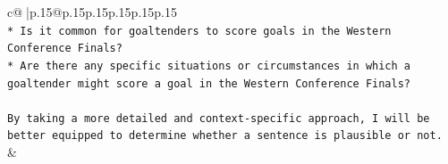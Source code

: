 \documentclass{article}
\begin{document}
{\begin{supertabular}{c@{$\;$}|p{.15\linewidth}@{}p{.15\linewidth}p{.15\linewidth}p{.15\linewidth}p{.15\linewidth}p{.15\linewidth}}
{{{\\ 
\texttt{* Is it common for goaltenders to score goals in the Western Conference Finals?} \\
\texttt{* Are there any specific situations or circumstances in which a goaltender might score a goal in the Western Conference Finals?} \\
\\ 
\texttt{By taking a more detailed and context{-}specific approach, I will be better equipped to determine whether a sentence is plausible or not.} \\
            }
        }
    }
    & \\ \\

\end{supertabular}
}
\end{document}
